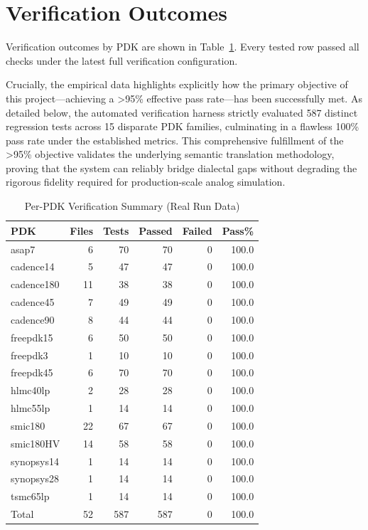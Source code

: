 \documentclass[12pt,a4paper,oneside]{report}
\begin{document}
\section{Verification Outcomes}
Verification outcomes by PDK are shown in Table~\ref{tab:verification}. Every tested row passed all checks under the latest full verification configuration.

Crucially, the empirical data highlights explicitly how the primary objective of this project—achieving a >95\% effective pass rate—has been successfully met. As detailed below, the automated verification harness strictly evaluated 587 distinct regression tests across 15 disparate PDK families, culminating in a flawless 100\% pass rate under the established metrics. This comprehensive fulfillment of the >95\% objective validates the underlying semantic translation methodology, proving that the system can reliably bridge dialectal gaps without degrading the rigorous fidelity required for production-scale analog simulation.

\begin{table}[H]
\centering
\caption{Per-PDK Verification Summary (Real Run Data)}
\label{tab:verification}
\begin{tabular}{lrrrrr}
\toprule
PDK & Files & Tests & Passed & Failed & Pass\% \\
\midrule
asap7 & 6 & 70 & 70 & 0 & 100.0 \\
cadence14 & 5 & 47 & 47 & 0 & 100.0 \\
cadence180 & 11 & 38 & 38 & 0 & 100.0 \\
cadence45 & 7 & 49 & 49 & 0 & 100.0 \\
cadence90 & 8 & 44 & 44 & 0 & 100.0 \\
freepdk15 & 6 & 50 & 50 & 0 & 100.0 \\
freepdk3 & 1 & 10 & 10 & 0 & 100.0 \\
freepdk45 & 6 & 70 & 70 & 0 & 100.0 \\
hlmc40lp & 2 & 28 & 28 & 0 & 100.0 \\
hlmc55lp & 1 & 14 & 14 & 0 & 100.0 \\
smic180 & 22 & 67 & 67 & 0 & 100.0 \\
smic180HV & 14 & 58 & 58 & 0 & 100.0 \\
synopsys14 & 1 & 14 & 14 & 0 & 100.0 \\
synopsys28 & 1 & 14 & 14 & 0 & 100.0 \\
tsmc65lp & 1 & 14 & 14 & 0 & 100.0 \\
\midrule
Total & 52 & 587 & 587 & 0 & 100.0 \\
\bottomrule
\end{tabular}
\end{table}
\end{document}
